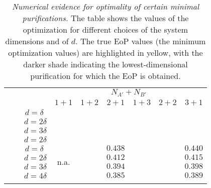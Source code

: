 \documentclass[prl,a4paper,notitlepage,twocolumn,superscriptaddress,longbibliography,reprint]{revtex4-2}
\newcommand{\ccaption}[2]{\caption{\emph{#1.} #2}}
\begin{document}
\begin{table}[t]
    \centering
    \renewcommand{\arraystretch}{1.25}
\begin{tabular}{@{} @{\hskip 7pt}c @{\hskip 7pt}c @{\hskip 7pt}| @{\hskip 7pt} c @{\hskip 7pt}| c @{\hskip 15pt} c c @{\hskip 15pt} c c c @{}
}
\toprule
&& & \multicolumn{6}{c}{$N_{A'}+N_{B'}$} \\
&& & $1+1$ & $1+2$ & $2+1$ & $1+3$ & $2+2$ & $3+1$
\\

\colrule
\parbox[t]{2mm}{} & \parbox[t]{2mm}{} & $d=\delta\;$ &  &  &  &  &  &  
\\
&& $d=2\delta$ &  &  &  &  &  &  
\\
&& $d=3\delta$ &  &  &  &  &  &  
\\
&& $d=2\delta$ &  &  &  &  &  &  
\\

& \parbox[t]{2mm}{} & $d=\delta\;$ &  &  & $0.438$ &  &  & $0.440$ 
\\
&& $d=2\delta$ &&  & $0.412$ &  &  & $0.415$ 
\\
&& $d=3\delta$ &&  & $0.394$ &  &  & $0.398$
\\
&& $d=4\delta$ &&  & $0.385$ &  &  & $0.389$
\\\botrule

\end{tabular}
    \ccaption{Numerical evidence for optimality of certain minimal purifications}{The table shows the values of the optimization for different choices of the system dimensions and of $d$. The true EoP values (the minimum optimization values) are highlighted in yellow, with the darker shade indicating the lowest-dimensional purification for which the EoP is obtained.}
\label{tab:non-minimal purifications}
\end{table}
\end{document}

